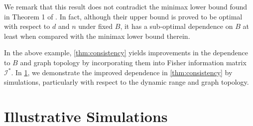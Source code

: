 We remark that this result does not contradict the minimax lower bound found in Theorem 1 of \citet{shah2016estimation}. In fact, although their upper bound is proved to be optimal with respect to $d$ and $n$ under fixed $B$, it has a sub-optimal dependence on $B$ at least when compared with the minimax lower bound therein. 

In the above example,  \ref{thm:consistency} yields improvements in the dependence to $B$ and graph topology by incorporating them into Fisher information matrix $\mathcal{I}^*$.
In \ref{sec:simulation}, we demonstrate the improved dependence in \ref{thm:consistency} by simulations, particularly with respect to the dynamic range and graph topology.

\section{Illustrative Simulations} \label{sec:simulation}

